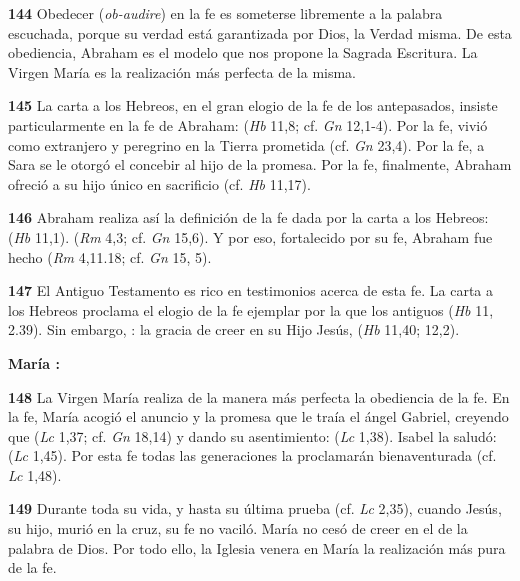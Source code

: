 \begin{body}
\begin{body}
\textbf{144} Obedecer (\emph{ob-audire}) en la fe es someterse libremente a la palabra escuchada, porque su verdad está garantizada por Dios, la Verdad misma. De esta obediencia, Abraham es el modelo que nos propone la Sagrada Escritura. La Virgen María es la realización más perfecta de la misma.

\textbf{145} La carta a los Hebreos, en el gran elogio de la fe de los antepasados, insiste particularmente en la fe de Abraham:  (\emph{Hb} 11,8; cf. \emph{Gn} 12,1-4). Por la fe, vivió como extranjero y peregrino en la Tierra prometida (cf. \emph{Gn} 23,4). Por la fe, a Sara se le otorgó el concebir al hijo de la promesa. Por la fe, finalmente, Abraham ofreció a su hijo único en sacrificio (cf. \emph{Hb} 11,17).

\textbf{146} Abraham realiza así la definición de la fe dada por la carta a los Hebreos:  (\emph{Hb} 11,1).  (\emph{Rm} 4,3; cf. \emph{Gn} 15,6). Y por eso, fortalecido por su fe, Abraham fue hecho  (\emph{Rm} 4,11.18; cf. \emph{Gn} 15, 5).

\textbf{147} El Antiguo Testamento es rico en testimonios acerca de esta fe. La carta a los Hebreos proclama el elogio de la fe ejemplar por la que los antiguos  (\emph{Hb} 11, 2.39). Sin embargo, : la gracia de creer en su Hijo Jesús,  (\emph{Hb} 11,40; 12,2).

\textbf{María : }

\textbf{148} La Virgen María realiza de la manera más perfecta la obediencia de la fe. En la fe, María acogió el anuncio y la promesa que le traía el ángel Gabriel, creyendo que  (\emph{Lc} 1,37; cf. \emph{Gn} 18,14) y dando su asentimiento:  (\emph{Lc} 1,38). Isabel la saludó:  (\emph{Lc} 1,45). Por esta fe todas las generaciones la proclamarán bienaventurada (cf. \emph{Lc} 1,48).

\textbf{149} Durante toda su vida, y hasta su última prueba (cf. \emph{Lc} 2,35), cuando Jesús, su hijo, murió en la cruz, su fe no vaciló. María no cesó de creer en el  de la palabra de Dios. Por todo ello, la Iglesia venera en María la realización más pura de la fe.


\end{body}
\end{body}
